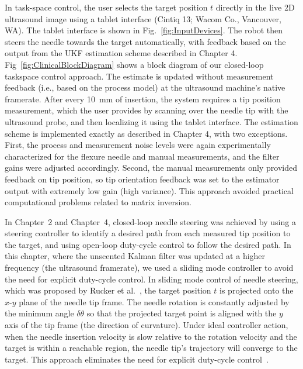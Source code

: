 In task-space control, the user selects the target position $t$ directly in the live 2D ultrasound image using a tablet interface (Cintiq 13; Wacom Co., Vancouver, WA). The tablet interface is shown in Fig.~\ref{fig:InputDevices}. The robot then steers the needle towards the target automatically, with feedback based on the output from the UKF estimation scheme described in Chapter 4. Fig~\ref{fig:ClinicalBlockDiagram} shows a block diagram of our closed-loop taskspace control approach. The estimate is updated without measurement feedback (i.e., based on the process model) at the ultrasound machine's native framerate. After every 10~mm of insertion, the system requires a tip position measurement, which the user provides by scanning over the needle tip with the ultrasound probe, and then localizing it using the tablet interface. The estimation scheme is implemented exactly as described in Chapter 4, with two exceptions. First, the process and measurement noise levels were again experimentally characterized for the flexure needle and manual measurements, and the filter gains were adjusted accordingly. Second, the manual measurements only provided feedback on tip position, so tip orientation feedback was set to the estimator output with extremely low gain (high variance). This approach avoided practical computational problems related to matrix inversion. 

In Chapter~2 and Chapter~4, closed-loop needle steering was achieved by using a steering controller to identify a desired path from each measured tip position to the target, and using open-loop duty-cycle control to follow the desired path. In this chapter, where the unscented Kalman filter was updated at a higher frequency (the ultrasound framerate), we used a sliding mode controller to avoid the need for explicit duty-cycle control. In sliding mode control of needle steering, which was proposed by Rucker et al.~\cite{Rucker2013}, the target position $t$ is projected onto the $x$-$y$ plane of the needle tip frame. The needle rotation is constantly adjusted by the minimum angle $\delta\theta$ so that the projected target point is aligned with the $y$ axis of the tip frame (the direction of curvature). Under ideal controller action, when the needle insertion velocity is slow relative to the rotation velocity and the target is within a reachable region, the needle tip's trajectory will converge to the target. This approach eliminates the need for explicit duty-cycle control~\cite{Minhas2007}. 

